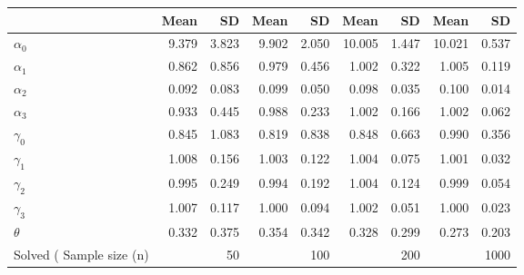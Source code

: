 
\begin{tabular}[t]{lrrrrrrrr}
\toprule
  & Mean & SD & Mean  & SD  & Mean   & SD   & Mean    & SD   \\
\midrule
$\alpha_{0}$ & 9.379 & 3.823 & 9.902 & 2.050 & 10.005 & 1.447 & 10.021 & 0.537\\
$\alpha_{1}$ & 0.862 & 0.856 & 0.979 & 0.456 & 1.002 & 0.322 & 1.005 & 0.119\\
$\alpha_{2}$ & 0.092 & 0.083 & 0.099 & 0.050 & 0.098 & 0.035 & 0.100 & 0.014\\
$\alpha_{3}$ & 0.933 & 0.445 & 0.988 & 0.233 & 1.002 & 0.166 & 1.002 & 0.062\\
$\gamma_{0}$ & 0.845 & 1.083 & 0.819 & 0.838 & 0.848 & 0.663 & 0.990 & 0.356\\
$\gamma_{1}$ & 1.008 & 0.156 & 1.003 & 0.122 & 1.004 & 0.075 & 1.001 & 0.032\\
$\gamma_{2}$ & 0.995 & 0.249 & 0.994 & 0.192 & 1.004 & 0.124 & 0.999 & 0.054\\
$\gamma_{3}$ & 1.007 & 0.117 & 1.000 & 0.094 & 1.002 & 0.051 & 1.000 & 0.023\\
$\theta$ & 0.332 & 0.375 & 0.354 & 0.342 & 0.328 & 0.299 & 0.273 & 0.203\\
Solved (%
Sample size (n) &  & 50 &  & 100 &  & 200 &  & 1000\\
\bottomrule
\end{tabular}
